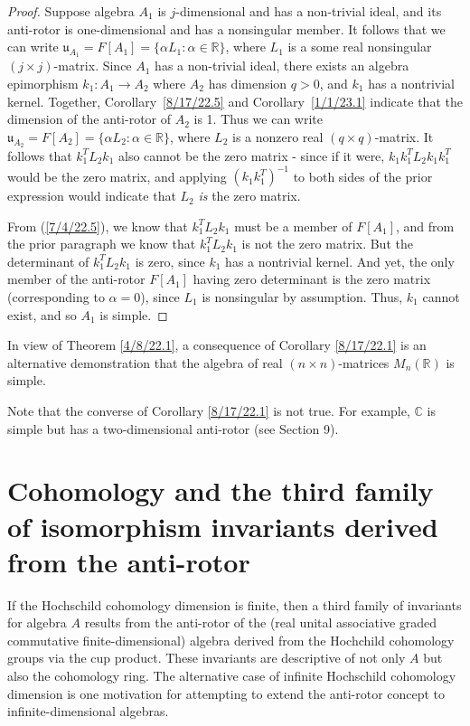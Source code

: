 \documentclass{amsart}
\numberwithin{equation}{section}
\theoremstyle{definition}
\numberwithin{theorem}{section}
\begin{document}
\begin{proof} Suppose algebra $A_1$ is $j$-dimensional and has a non-trivial ideal, and its anti-rotor is one-dimensional and has a nonsingular member.  It follows that we can write $\mathfrak{u}_{A_1} = F[A_1] = \{\alpha L_1:\alpha\in \mathbb{R}\}$, where $L_1$ is a some real nonsingular $(j\times j)$-matrix.  Since $A_1$ has a non-trivial ideal, there exists an algebra epimorphism $k_1:A_1\rightarrow A_2$ where $A_2$ has dimension $q>0$, and $k_1$ has a nontrivial kernel.  Together, \mbox{Corollary \ref{8/17/22.5}} and \mbox{Corollary \ref{1/1/23.1}} indicate that the dimension of the anti-rotor of $A_2$ is 1.   Thus we can write $\mathfrak{u}_{A_2} = F[A_2] = \{\alpha L_2:\alpha\in \mathbb{R}\}$, where $L_2$ is a nonzero real $(q\times q)$-matrix.  It follows that $k_1^T L_2 k_1$ also cannot be the zero matrix - since if it were, $k_1k_1^T L_2 k_1k_1^T$ would be the zero matrix, and applying $(k_1k_1^T)^{-1}$ to both sides of the prior expression would indicate that $L_2$ {\it is} the zero matrix.  

From (\ref{7/4/22.5}), we know that $ k_1^T L_2 k_1$ must be a member of $F[A_1]$, and from the prior paragraph we know that $ k_1^T L_2 k_1$ is not the zero matrix.  But the determinant of $k_1^T L_2 k_1$ is zero, since $k_1$ has a  nontrivial kernel.  And yet, the only member of the anti-rotor $F[A_1]$ having zero determinant is the zero matrix (corresponding to $\alpha=0$), since $L_1$ is nonsingular by assumption.   Thus, $k_1$ cannot exist, and so $A_1$ is simple. \end{proof}

In view of Theorem \ref{4/8/22.1}, a consequence of Corollary \ref{8/17/22.1} is an alternative demonstration that the algebra of real $(n\times n)$-matrices $ M_n(\mathbb{R})$ is simple.  

Note that the converse of Corollary \ref{8/17/22.1} is not true.  For example, $\mathbb{C}$ is simple but has a two-dimensional anti-rotor (see Section 9). 

\section{Cohomology and the third family of isomorphism invariants derived from the anti-rotor} 
If the Hochschild cohomology dimension is finite, then a third family of invariants for algebra $A$ results from the anti-rotor of the (real unital associative graded commutative finite-dimensional) algebra derived from the Hochchild \mbox{cohomology} groups via the cup product.  These invariants are descriptive of not only $A$ but also the cohomology ring.  The alternative case of infinite Hochschild cohomology dimension is one motivation for attempting to extend the anti-rotor concept to infinite-dimensional algebras. 
\end{document}
